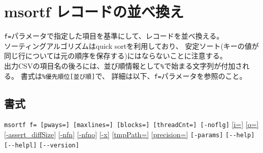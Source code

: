 
%

\section{msortf レコードの並べ換え\label{sect:msortf}}
\verb|f=|パラメータで指定した項目を基準にして、レコードを並べ換える。\\
ソーティングアルゴリズムはquick sortを利用しており、
安定ソート(キーの値が同じ行については元の順序を保存する)にはならないことに注意する。\\
出力CSVの項目名の後ろには、並び順情報として\verb|%|で始まる文字列が付加される。
書式は\verb|%優先順位[並び順]|で、
詳細は以下、\verb|f=|パラメータを参照のこと。

\subsection*{書式}
\verb|msortf f= [pways=] [maxlines=] [blocks=] [threadCnt=] [-noflg]|
\hyperref[sect:option_i]{[i=]}
\hyperref[sect:option_o]{[o=]}
\hyperref[sect:option_assert_diffSize]{[-assert\_diffSize]}
\hyperref[sect:option_nfn]{[-nfn]} 
\hyperref[sect:option_nfno]{[-nfno]}  
\hyperref[sect:option_x]{[-x]}
\hyperref[sect:option_tmpPath]{[tmpPath=]} 
\hyperref[sect:option_precision]{[precision=]}
\verb|[-params]|
\verb|[--help]|
\verb|[--helpl]|
\verb|[--version]|\\

